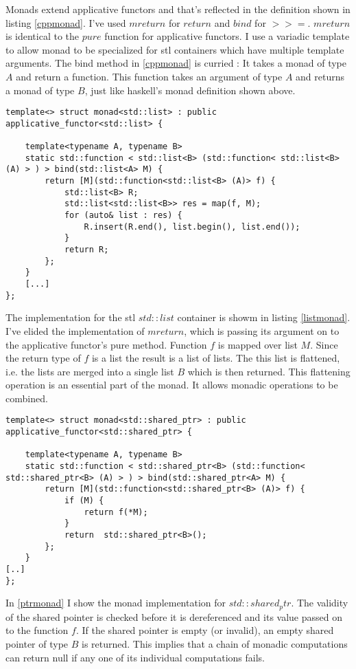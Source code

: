 \documentclass[12pt,fleqn]{article}
\begin{document}
Monads extend applicative functors and that's reflected in the definition shown in listing \ref{cppmonad}.
I've used $mreturn$ for $return$ and $bind$ for $>>=$.
$mreturn$ is identical to the $pure$ function for applicative functors.
I use a variadic template to allow monad to be specialized for stl containers which have multiple template arguments. 
The bind method in \ref{cppmonad} is curried : It takes a monad of type $A$ and return a function.
This function takes an argument of type $A$ and returns a monad of type $B$, just like haskell's monad definition shown above.
\begin{lstlisting}[caption=monad for std::list, label=listmonad]
template<> struct monad<std::list> : public applicative_functor<std::list> {

	template<typename A, typename B>
	static std::function < std::list<B> (std::function< std::list<B> (A) > ) > bind(std::list<A> M) {
		return [M](std::function<std::list<B> (A)> f) {
			std::list<B> R;
			std::list<std::list<B>> res = map(f, M);
			for (auto& list : res) {
				R.insert(R.end(), list.begin(), list.end());
			}
			return R;
		};
	}
    [...]
};
\end{lstlisting}
The implementation for the stl $std::list$ container is showm in listing \ref{listmonad}.
I've elided the implementation of $mreturn$, which is passing its argument on to the applicative functor's pure method.
Function $f$ is mapped over list $M$. Since the return type of $f$ is a list the result is a list of lists.
The this list is flattened, i.e. the lists are merged into a single list $B$ which is then returned.
This flattening operation is an essential part of the monad. It allows monadic operations to be combined.
\begin{lstlisting}[caption=monad implemention for std::shared\_ptr, label=ptrmonad]
template<> struct monad<std::shared_ptr> : public applicative_functor<std::shared_ptr> {

	template<typename A, typename B>
	static std::function < std::shared_ptr<B> (std::function< std::shared_ptr<B> (A) > ) > bind(std::shared_ptr<A> M) {
		return [M](std::function<std::shared_ptr<B> (A)> f) {
			if (M) {
				return f(*M);
			}
			return  std::shared_ptr<B>();
		};
	}
[..]
};
\end{lstlisting}

In \ref{ptrmonad} I show the monad implementation for $std::shared_ptr$. 
The validity of the shared pointer is checked before it is dereferenced and its value passed on to the function $f$.
If the shared pointer is empty (or invalid), an empty shared pointer of type $B$ is returned.
This implies that a chain of monadic computations can return null if any one of its individual computations fails.
\end{document}
